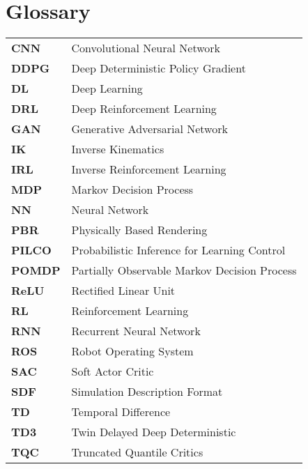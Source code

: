 %
\chapter*{Glossary}

\capstartfalse
\begin{table}[!hb]
    \begin{tabular}{ll}
        \textbf{CNN}   & Convolutional Neural Network                 \\
        \textbf{DDPG}  & Deep Deterministic Policy Gradient           \\
        \textbf{DL}    & Deep Learning                                \\
        \textbf{DRL}   & Deep Reinforcement Learning                  \\
        \textbf{GAN}   & Generative Adversarial Network               \\
        \textbf{IK}    & Inverse Kinematics                           \\
        \textbf{IRL}   & Inverse Reinforcement Learning               \\
        \textbf{MDP}   & Markov Decision Process                      \\
        \textbf{NN}    & Neural Network                               \\
        \textbf{PBR}   & Physically Based Rendering                   \\
        \textbf{PILCO} & Probabilistic Inference for Learning Control \\
        \textbf{POMDP} & Partially Observable Markov Decision Process \\
        \textbf{ReLU}  & Rectified Linear Unit                        \\
        \textbf{RL}    & Reinforcement Learning                       \\
        \textbf{RNN}   & Recurrent Neural Network                     \\
        \textbf{ROS}   & Robot Operating System                       \\
        \textbf{SAC}   & Soft Actor Critic                            \\
        \textbf{SDF}   & Simulation Description Format                \\
        \textbf{TD}    & Temporal Difference                          \\
        \textbf{TD3}   & Twin Delayed Deep Deterministic              \\
        \textbf{TQC}   & Truncated Quantile Critics                   \\
    \end{tabular}
\end{table}
\capstarttrue
